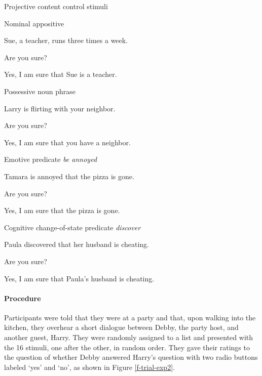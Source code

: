\documentclass[11pt,fleqn]{article}
\newcommand{\6}{\mbox{$[\hspace*{-.6mm}[$}}
\newcommand{\9}{\mbox{$]\hspace*{-.6mm}]$}}
\begin{document}
\begin{exe}
\ex\label{proj} Projective content control stimuli

\begin{xlist}

\ex Nominal appositive
\begin{xlist}
 Sue, a teacher, runs three times a week.

 Are you sure?

 Yes, I am sure that Sue is a teacher.
\end{xlist}


\ex Possessive noun phrase
\begin{xlist}
 Larry is flirting with your neighbor.

 Are you sure?

 Yes, I am sure that you have a neighbor.
\end{xlist}

\ex Emotive predicate {\em be annoyed} 
\begin{xlist}
 Tamara is annoyed that the pizza is gone.

 Are you sure?

 Yes, I am sure that the pizza is gone.
\end{xlist}

\ex Cognitive change-of-state predicate {\em discover}
\begin{xlist}
 Paula discovered that her husband is cheating.

 Are you sure?

 Yes, I am sure that Paula's husband is cheating.
\end{xlist}
\end{xlist}
\end{exe}

\paragraph{Procedure} 


Participants were told that they were at a party and that, upon walking into the kitchen, they overhear a short dialogue between Debby, the party host, and another guest, Harry. They were randomly assigned to a list and presented with the 16 stimuli, one after the other, in random order. They gave their ratings to the question of whether Debby answered Harry's question with two radio buttons labeled `yes' and `no', as shown in Figure \ref{f-trial-exp2}.  
\end{document}
